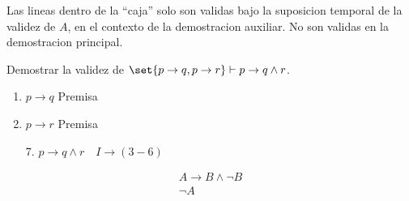 \begin{remark}
	Las lineas dentro de la ``caja'' solo son validas bajo la suposicion temporal de la validez de \(A \), en el contexto de la demostracion auxiliar. No son validas en la demostracion principal.
\end{remark}

\begin{example}
	Demostrar la validez de \(\set{p\rightarrow q, p\rightarrow r } \vdash p \rightarrow q \wedge r \).

	\begin{enumerate}
		\item \(p \rightarrow q \) Premisa
		\item \(p \rightarrow r \) Premisa

	\end{enumerate}
	\begin{enumerate}[resume]
		\item[7.] \(p \to q \wedge r \quad I\to (3-6)\)
	\end{enumerate}
\end{example}

\begin{definition}
	\[
		\begin{array}{c}
			A \rightarrow B \wedge  \neg B \\ \hline
			\neg A
		\end{array}
	\]
\end{definition}

